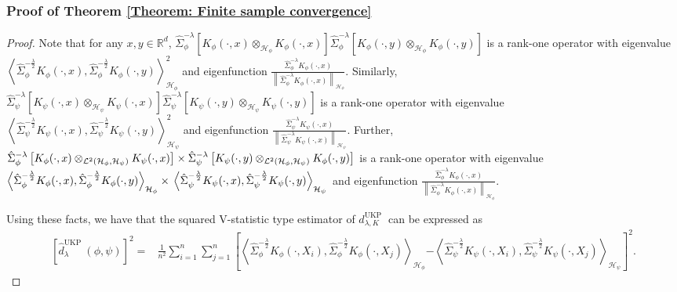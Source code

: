 \documentclass{article}
\theoremstyle{plain}
\newcommand{\R}{\mathbb{R}}
\newcommand{\HS}{\mathcal{L}^{2}}
\newcommand{\repone}{\phi}
\newcommand{\reptwo}{\psi}
\newcommand{\Hone}{\mathcal{H}_{\phi}}
\newcommand{\Htwo}{\mathcal{H}_{\psi}}
\newcommand{\norm}[1]{\left\|#1\right\|}
\newcommand{\inprod}[1]{\left \langle #1 \right\rangle}
\newcommand{\metricstname}{UKP }
\begin{document}
\subsubsection{Proof of Theorem \ref{Theorem: Finite sample convergence}}\label{Proof of Theorem 2}

\begin{proof}
    Note that for any $x,y \in \R^{d}$, $\hat{\Sigma}_{\repone}^{-\lambda}\left[K_{\repone}(\cdot,x)\otimes_{\Hone}K_{\repone}(\cdot,x)\right]\hat{\Sigma}_{\repone}^{-\lambda}\left[K_{\repone}(\cdot,y)\otimes_{\Hone}K_{\repone}(\cdot,y)\right]$ is a rank-one operator with eigenvalue $\inprod{\hat{\Sigma}_{\repone}^{-\frac{\lambda}{2}}K_{\repone}(\cdot,x),\hat{\Sigma}_{\repone}^{-\frac{\lambda}{2}}K_{\repone}(\cdot,y)}_{\Hone}^{2}$ and eigenfunction $\frac{\hat{\Sigma}_{\repone}^{-\lambda}K_{\repone}(\cdot,x)}{\norm{\hat{\Sigma}_{\repone}^{-\lambda}K_{\repone}(\cdot,x)}_{\Hone}}$. Similarly, $\hat{\Sigma}_{\reptwo}^{-\lambda}\left[K_{\reptwo}(\cdot,x)\otimes_{\Htwo}K_{\reptwo}(\cdot,x)\right]\hat{\Sigma}_{\reptwo}^{-\lambda}\left[K_{\reptwo}(\cdot,y)\otimes_{\Htwo}K_{\reptwo}(\cdot,y)\right]$ is a rank-one operator with eigenvalue $\inprod{\hat{\Sigma}_{\reptwo}^{-\frac{\lambda}{2}}K_{\reptwo}(\cdot,x),\hat{\Sigma}_{\reptwo}^{-\frac{\lambda}{2}}K_{\reptwo}(\cdot,y)}_{\Htwo}^{2}$ and eigenfunction $\frac{\hat{\Sigma}_{\reptwo}^{-\lambda}K_{\reptwo}(\cdot,x)}{\norm{\hat{\Sigma}_{\reptwo}^{-\lambda}K_{\reptwo}(\cdot,x)}_{\Htwo}}$. Further, $\hat{\Sigma}_{\repone}^{-\lambda}\left[K_{\repone}(\cdot,x)\otimes_{\HS(\Hone,\Htwo)}K_{\reptwo}(\cdot,x)\right] \times \\\hat{\Sigma}_{\reptwo}^{-\lambda}\left[K_{\reptwo}(\cdot,y)\otimes_{\HS(\Hone,\Htwo)}K_{\repone}(\cdot,y)\right]$ is a rank-one operator with eigenvalue $\inprod{\hat{\Sigma}_{\repone}^{-\frac{\lambda}{2}}K_{\repone}(\cdot,x),\hat{\Sigma}_{\repone}^{-\frac{\lambda}{2}}K_{\repone}(\cdot,y)}_{\Hone}\times\\\inprod{\hat{\Sigma}_{\reptwo}^{-\frac{\lambda}{2}}K_{\reptwo}(\cdot,x),\hat{\Sigma}_{\reptwo}^{-\frac{\lambda}{2}}K_{\reptwo}(\cdot,y)}_{\Htwo}$ and eigenfunction $\frac{\hat{\Sigma}_{\repone}^{-\lambda}K_{\repone}(\cdot,x)}{\norm{\hat{\Sigma}_{\repone}^{-\lambda}K_{\repone}(\cdot,x)}_{\Hone}}$.

    Using these facts, we have that the squared V-statistic type estimator of $d_{\lambda,K}^{\text{\metricstname}}$ can be expressed as
    \[
    \begin{aligned}
        \left[\hat{d}_{\lambda}^{\text{\metricstname}}(\repone,\reptwo)\right]^{2}
        =&\frac{1}{n^{2}}\sum_{i=1}^{n}\sum_{j=1}^{n}\left[\inprod{\hat{\Sigma}_{\repone}^{-\frac{\lambda}{2}}K_{\repone}(\cdot,X_{i}),\hat{\Sigma}_{\repone}^{-\frac{\lambda}{2}}K_{\repone}(\cdot,X_{j})}_{\Hone}\right.\left.-\inprod{\hat{\Sigma}_{\reptwo}^{-\frac{\lambda}{2}}K_{\reptwo}(\cdot,X_{i}),\hat{\Sigma}_{\reptwo}^{-\frac{\lambda}{2}}K_{\reptwo}(\cdot,X_{j})}_{\Htwo}\right]^{2}.
    \end{aligned}
    \]


\end{proof}
\end{document}
